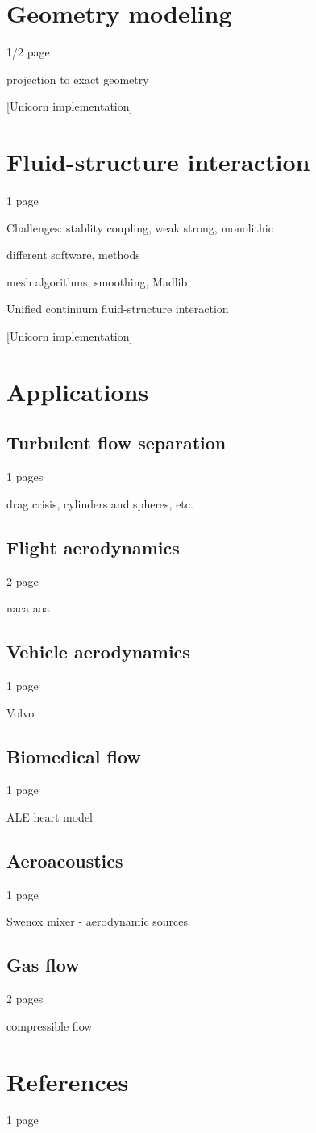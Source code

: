 \section{Geometry modeling}

1/2 page

projection to exact geometry

[Unicorn implementation]

\section{Fluid-structure interaction}

1 page

Challenges: stablity coupling, weak strong, monolithic

different software, methods

mesh algorithms, smoothing, Madlib

Unified continuum fluid-structure interaction

[Unicorn implementation]

\section{Applications}

\subsection{Turbulent flow separation}

1 pages

drag crisis, cylinders and spheres, etc. 

\subsection{Flight aerodynamics}

2 page 

naca aoa

\subsection{Vehicle aerodynamics} 

1 page 

Volvo

\subsection{Biomedical flow}

1 page 

ALE heart model 

\subsection{Aeroacoustics}

1 page 

Swenox mixer - aerodynamic sources 

\subsection{Gas flow}

2 pages 

compressible flow 

\section{References}

1 page
